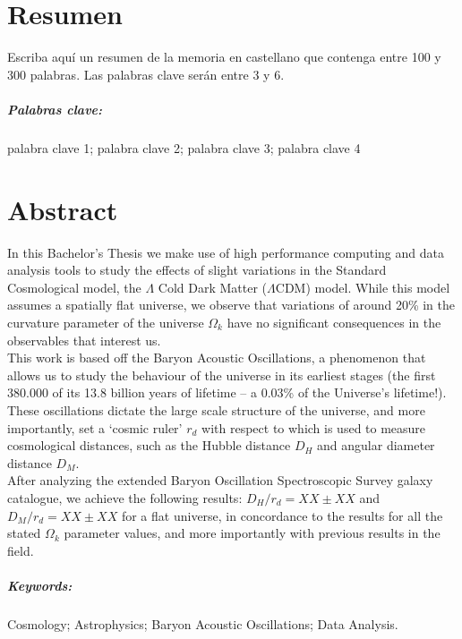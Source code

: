\chapter*{Resumen}

Escriba aquí un resumen de la memoria en castellano que contenga entre 100 y 300 palabras. Las palabras clave serán entre 3 y 6.

\paragraph{Palabras clave:} palabra clave 1; palabra clave 2; palabra clave 3; palabra clave 4 









\chapter*{Abstract}


In this Bachelor's Thesis we make use of high performance computing and data analysis tools to study the effects of slight variations in the Standard Cosmological model, the $\Lambda$ Cold Dark Matter ($\Lambda$CDM) model. While this model assumes a spatially flat universe, we observe that variations of around 20\% in the curvature parameter of the universe $\Omega_k$ have no significant consequences in the observables that interest us.\\

This work is based off the Baryon Acoustic Oscillations, a phenomenon that allows us to study the behaviour of the universe in its earliest stages (the first 380.000 of its 13.8 billion years of lifetime -- a 0.03\% of the Universe's lifetime!). These oscillations dictate the large scale structure of the universe, and more importantly, set a `cosmic ruler' $r_d$ with respect to which is used to measure cosmological distances, such as the Hubble distance $D_H$ and angular diameter distance $D_M$.\\

After analyzing the extended Baryon Oscillation Spectroscopic Survey galaxy catalogue, we achieve the following results: $D_H/r_d = XX\pm XX$ and $D_M /r_d = XX \pm XX$ for a flat universe, in concordance to the results for all the stated  $\Omega_k$ parameter values, and more importantly with previous results in the field.





\paragraph{Keywords:} Cosmology; Astrophysics; Baryon Acoustic Oscillations; Data Analysis.
